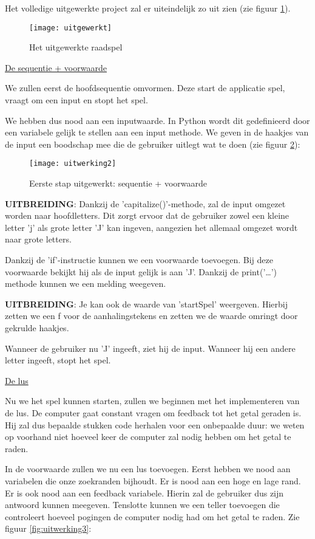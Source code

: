Het volledige uitgewerkte project zal er uiteindelijk zo uit zien (zie figuur \ref{fig:uitwerkingAfgewerkt}).

\begin{figure}
    \texttt{[image: uitgewerkt]}
    \caption{Het uitgewerkte raadspel}
    \label{fig:uitwerkingAfgewerkt}
\end{figure}

\underline{De sequentie + voorwaarde}

We zullen eerst de hoofdsequentie omvormen. Deze start de applicatie spel, vraagt om een input en stopt het spel.

We hebben dus nood aan een inputwaarde. In Python wordt dit gedefinieerd door een variabele gelijk te stellen aan een input methode. We geven in de haakjes van de input een boodschap mee die de gebruiker uitlegt wat te doen (zie figuur \ref{fig:uitwerking2}):

\begin{figure}
    \texttt{[image: uitwerking2]}
    \caption{Eerste stap uitgewerkt: sequentie + voorwaarde}
    \label{fig:uitwerking2}
\end{figure}

\textbf{UITBREIDING}: Dankzij de 'capitalize()'-methode, zal de input omgezet worden naar hoofdletters. Dit zorgt ervoor dat de gebruiker zowel een kleine letter 'j' als grote letter 'J' kan ingeven, aangezien het allemaal omgezet wordt naar grote letters.

Dankzij de 'if'-instructie kunnen we een voorwaarde toevoegen. Bij deze voorwaarde bekijkt hij als de input gelijk is aan 'J'. 
Dankzij de print('…') methode kunnen we een melding weegeven.

\textbf{UITBREIDING}: Je kan ook de waarde van 'startSpel' weergeven. Hierbij zetten we een f voor de aanhalingstekens en zetten we de waarde omringt door gekrulde haakjes. 

Wanneer de gebruiker nu 'J' ingeeft, ziet hij de input. Wanneer hij een andere letter ingeeft, stopt het spel.

\underline{De lus}

Nu we het spel kunnen starten, zullen we beginnen met het implementeren van de lus. De computer gaat constant vragen om feedback tot het getal geraden is. Hij zal dus bepaalde stukken code herhalen voor een onbepaalde duur: we weten op voorhand niet hoeveel keer de computer zal nodig hebben om het getal te raden.  

In de voorwaarde zullen we nu een lus toevoegen. Eerst hebben we nood aan variabelen die onze zoekranden bijhoudt. Er is nood aan een hoge en lage rand. 
Er is ook nood aan een feedback variabele. Hierin zal de gebruiker dus zijn antwoord kunnen meegeven.
Tenslotte kunnen we een teller toevoegen die controleert hoeveel pogingen de computer nodig had om het getal te raden. Zie figuur \ref{fig:uitwerking3}:

